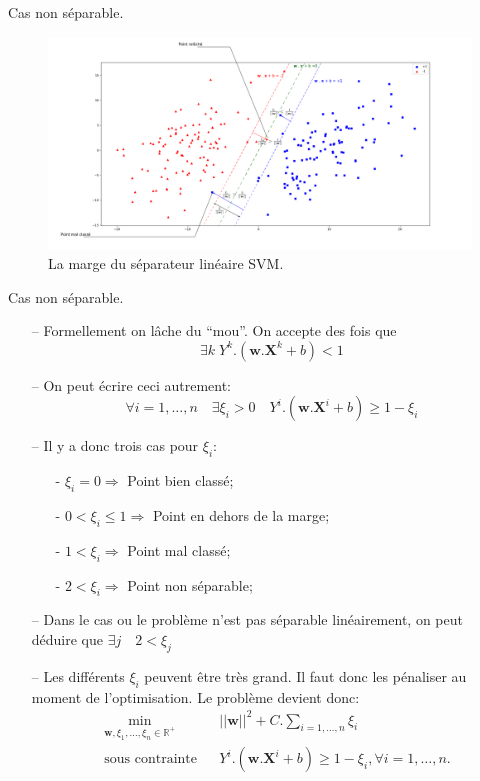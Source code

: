 \documentclass[9pt]{beamer}
\begin{document}
	\begin{frame}{Cas non séparable.}
		\begin{figure}[H]
			\includegraphics[width=\textwidth]{stable_margin}
			\caption{\label{fig::stable_margin} La marge du séparateur linéaire SVM.}
		\end{figure}
	\end{frame}

	\begin{frame}{Cas non séparable.}
		\begin{itemize}
			\item[--] Formellement on lâche du ``mou''. On accepte des fois que
			$$\exists k \; Y^k.(\textbf{w}.\textbf{X}^k + b) < 1$$
			\item[--] On peut écrire ceci autrement:
			$$\forall i=1,\dots,n \quad \exists \xi_i > 0 \quad Y^i.(\textbf{w}.\textbf{X}^i + b) \geq 1 - \xi_i$$

			\item[--] Il y a donc trois cas pour $ \xi_i $:
			\begin{itemize}
				\item[-] $\xi_i = 0 \Rightarrow$ Point bien classé;
				\item[-] $0 < \xi_i \leq 1 \Rightarrow$ Point en dehors de la marge;
				\item[-] $1 < \xi_i \Rightarrow$ Point mal classé;
				\item[-] $2 < \xi_i \Rightarrow$ Point non séparable;
			\end{itemize}

			\item[--] Dans le cas ou le problème n'est pas séparable linéairement, on peut déduire que
			$\exists j \quad 2 < \xi_j$

			\item[--] Les différents $\xi_i$ peuvent être très grand. Il faut donc les pénaliser au moment de l'optimisation. Le problème devient donc:
			\begin{equation}
				\begin{aligned}
				& \min_{\textbf{w}, \xi_1,\dots,\xi_n \in \mathbb{R}^+}
				& & {\vert\vert \textbf{w} \vert\vert}^2 + C.\sum_{i=1,\dots,n}\xi_i\\
				& \text{sous contrainte}
				& & Y^i.(\textbf{w}.\textbf{X}^i + b) \geq 1 - \xi_i , \forall i = 1, \dots, n.
				\end{aligned}
			\end{equation}
		\end{itemize}
	\end{frame}
\end{document}
